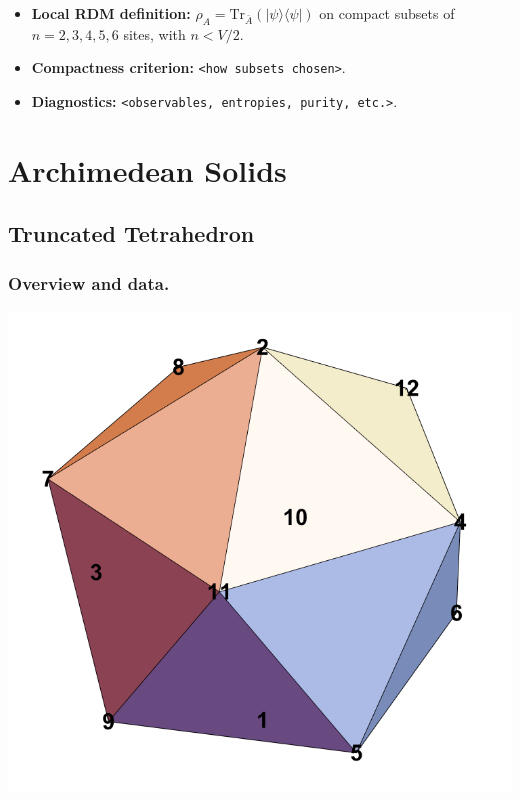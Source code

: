 \documentclass[11pt,a4paper]{article}
\begin{document}
\begin{itemize}[leftmargin=1.5em]
  \item \textbf{Local RDM definition:} $\rho_A=\mathrm{Tr}_{\bar A}(|\psi\rangle\langle\psi|)$ on compact subsets of $n=2,3,4,5,6$ sites, with $n < V/2$.
  \item \textbf{Compactness criterion:} \texttt{<how subsets chosen>}.
  \item \textbf{Diagnostics:} \texttt{<observables, entropies, purity, etc.>}.
\end{itemize}


\section*{Archimedean Solids}

\subsection*{Truncated Tetrahedron}

\subsubsection*{Overview and data.}
\begin{center}
  \includegraphics[width=.6\linewidth]{icosahedron}
\end{center}
\end{document}
